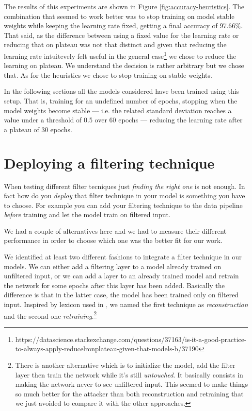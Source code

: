 The results of this experiments are shown in Figure \ref{fig:accuracy-heuristics}. The
combination that seemed to work better was to stop training on model
stable weights while keeping the learning rate fixed, getting a final
accuracy of 97.66\%. That said, as the difference between using a fixed
value for the learning rate or reducing that on plateau was not that
distinct and given that reducing the learning rate intuitevely felt
useful in the general
case\footnote{https://datascience.stackexchange.com/questions/37163/is-it-a-good-practice-to-always-apply-reducelronplateau-given-that-models-b/37190}
we chose to reduce the learning on plateau. We understand the decision
is rather arbitrary but we chose that. As for the heuristics we chose
to stop training on stable weights.

In the following sections all the models considered have been trained
using this setup. That is, training for an undefined number of
epochs, stopping when the model weights become stable --- i.e. the
related standard deviation reaches a value under a threshold of 0.5 over
60 epochs --- reducing the learning rate after a plateau of 30 epochs.

\section{Deploying a filtering technique}
\label{sec:deploying-a-filtering-technique}

When testing different filter tecniques just \emph{finding the right
  one} is not enough. In fact how do you \emph{deploy} that filter
technique in your model is something you have to choose. For example
you can add your filtering technique to the data pipeline \emph{before}
training and let the model train on filtered input.

We had a couple of alternatives here and we had to measure their
different performance in order to choose which one was the better fit
for our work.

We identified at least two different fashions to integrate a filter
technique in our models. We can either add a filtering layer to a model
already trained on unfiltered input, or we can add a layer to an
already trained model and retrain the network for some epochs after
this layer has been added. Basically the difference is that in the latter case, the model has
been trained only on filtered input.
Inspired by lexicon used in \cite{bhagoji2018enhancing}, we named the
first technique as \emph{reconstruction} and the second one
\emph{retraining}.\footnote{There is another alternative which is to
  initialize the model, add the filter layer then train the network
  while it's still \emph{untouched}. It basically consists in making
  the network never to see unfiltered input. This seemed to make things
  so much better for the attacker than both reconstruction and
  retraining that we just avoided to compare it with the other
  approaches.}

